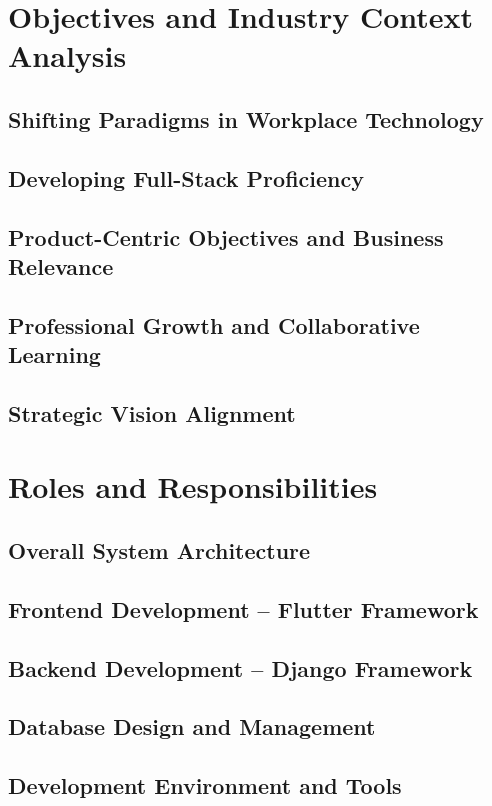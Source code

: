 \documentclass[a4paper, 11pt, oneside]{report}
\begin{document}
\chapter{Objectives and Industry Context Analysis}
\section{Shifting Paradigms in Workplace Technology}
\section{Developing Full-Stack Proficiency}
\section{Product-Centric Objectives and Business Relevance}
\section{Professional Growth and Collaborative Learning}
\section{Strategic Vision Alignment}


\chapter{Roles and Responsibilities}
\section{Overall System Architecture}
\section{Frontend Development – Flutter Framework}
\section{Backend Development – Django Framework}
\section{Database Design and Management}
\section{Development Environment and Tools}

\end{document}
